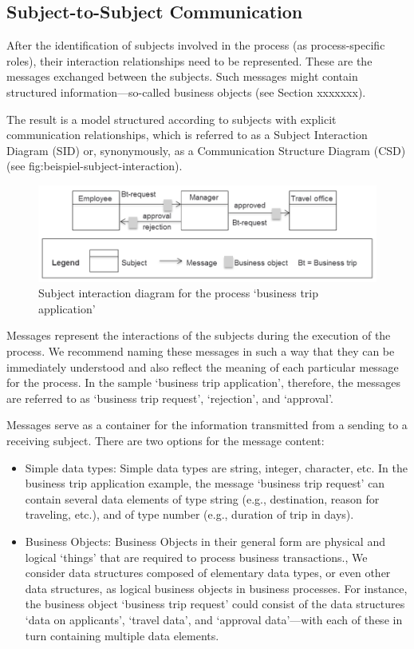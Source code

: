 \subsection{Subject-to-Subject Communication}
After the identification of subjects involved in the process (as process-specific roles), their interaction relationships need to be represented. These are the messages exchanged between the subjects. Such messages might contain structured information—so-called business objects (see Section xxxxxxx).\

The result is a model structured according to subjects with explicit communication relationships, which is referred to as a Subject Interaction Diagram (SID) or, synonymously, as a Communication Structure Diagram (CSD) (see \figurename{fig:beispiel-subject-interaction}).

\begin{figure}
	\centering
	\includegraphics[width=14cm]{20181026-Ontologie-Bilder/Grafiken-Ontologie/SUbject-Interaction/Beispiel-Subject-Interaction}
	\caption[Subject interaction diagram]{Subject interaction diagram for the process ‘business trip application’}
	\label{fig:beispiel-subject-interaction}
\end{figure}


Messages represent the interactions of the subjects during the execution of the process. We recommend naming these messages in such a way that they can be immediately understood and also reflect the meaning of each particular message for the process. In the sample ‘business trip application’, therefore, the messages are referred to as ‘business trip request’, ‘rejection’, and ‘approval’.

Messages serve as a container for the information transmitted from a sending to a receiving subject. There are two options for the message content:

\begin{itemize}
	\item 	Simple data types: Simple data types are string, integer, character, etc. In the business trip application example, the message ‘business trip request’ can contain several data elements of type string (e.g., destination, reason for traveling, etc.), and of type number (e.g., duration of trip in days).
	\item Business Objects: Business Objects in their general form are physical and logical ‘things’ that are required to process business transactions., We consider data structures composed of elementary data types, or even other data structures, as logical business objects in business processes. For instance, the business object ‘business trip request’ could consist of the data structures ‘data on applicants’, ‘travel data’, and ‘approval data’—with each of these in turn containing multiple data elements.
\end{itemize}


